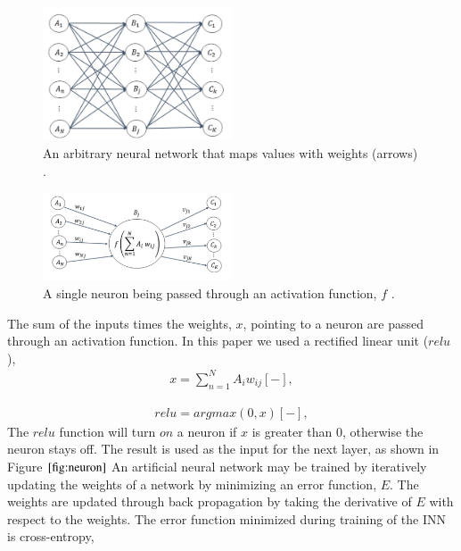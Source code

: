 \documentclass[fleqn]{anstrans}
\begin{document}
\begin{figure}[ht]
\centering
\includegraphics[width=0.5\textwidth]{../figures/dense-layer-figure.png}
\caption{An arbitrary neural network that maps values with weights (arrows) \cite{kamudaComparisonMachineLearning2018a}.}
\label{fig:dense-nn}
\end{figure}
\begin{figure}[ht]
\centering
\includegraphics[width=0.5\textwidth]{../figures/neuron-figure.png}
\caption{A single neuron being passed through an activation function, $\textit{f}$ \cite{kamudaComparisonMachineLearning2018a}.}
\label{fig:neuron}
\end{figure}

The sum of the inputs times the weights, $x$, pointing to a neuron are passed through an activation function.
In this paper we used a rectified linear unit ($\textit{relu}$),
\begin{equation}
	\begin{aligned}
		x = \sum_{n=1}^{N}A_i w_{ij} [-],
	\end{aligned}
\end{equation}  

\begin{equation}
	\begin{aligned}
		relu = argmax(0, x) [-],
	\end{aligned}
\end{equation}
The $\textit{relu}$ function will turn $on$ a neuron if $x$ is greater than 0, otherwise the neuron stays off.
The result is used as the input for the next layer, as shown in Figure $\ref{fig:neuron}$ 
An artificial neural network may be trained by iteratively updating the weights of a network by minimizing an error function, $E$. 
The weights are updated through back propagation by taking the derivative of $E$ with respect to the weights. 
The error function minimized during training of the INN is cross-entropy,
\end{document}
